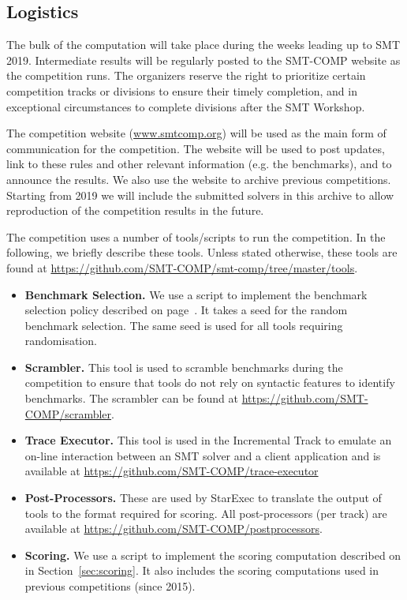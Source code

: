 \documentclass[12pt]{article}
\newcommand{\inctrack}{Incremental Track\xspace}
\begin{document}
\subsection{Logistics}
\label{sec:logistics}

%
The bulk of the computation will take place during the weeks leading
up to SMT 2019.  Intermediate results will be regularly posted to the
SMT-COMP website as the competition runs.
%
The organizers reserve the right to prioritize certain competition
tracks or divisions to ensure their timely completion, and in
exceptional circumstances to complete divisions after the SMT
Workshop.


The competition website (\url{www.smtcomp.org}) will be used as the main form
of communication for the competition. The website will be used to post updates,
link to these rules and other relevant information (e.g. the benchmarks), and
to announce the results. We also use the website to archive previous
competitions. Starting from 2019 we will include the submitted solvers in this
archive to allow reproduction of the competition results in the future.
%

 \label{tools}
The competition uses a number of tools/scripts to run the competition. In the
following, we briefly describe these tools. Unless stated otherwise, these
tools are found at \url{https://github.com/SMT-COMP/smt-comp/tree/master/tools}.
\begin{itemize}
  \item \textbf{Benchmark Selection.} We use a script to implement the
    benchmark selection policy described on page~\pageref{benchmark-selection}.
    It takes a seed for the random benchmark selection. The same seed is used
    for all tools requiring randomisation.
  \item \textbf{Scrambler.} This tool is used to scramble benchmarks during the
    competition to ensure that tools do not rely on syntactic features to
    identify benchmarks. The scrambler can be found at
    \url{https://github.com/SMT-COMP/scrambler}.
  \item \textbf{Trace Executor.} This tool is used in the \inctrack to emulate
    an on-line interaction between an SMT solver and a client application and
    is available at \url{https://github.com/SMT-COMP/trace-executor}
  \item \textbf{Post-Processors.} These are used by StarExec to translate the
    output of tools to the format required for scoring. All post-processors (per
    track) are available at \url{https://github.com/SMT-COMP/postprocessors}.
  \item \textbf{Scoring.} We use a script to implement the scoring computation
    described on in Section~\ref{sec:scoring}. It also includes the scoring
    computations used in previous competitions (since 2015).
\end{itemize}
\end{document}
